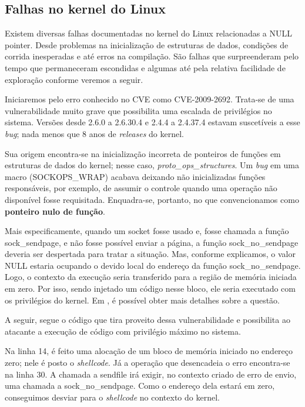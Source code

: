 		
		\subsection{Falhas no kernel do Linux}
		\label{subsec:linux_kernel_vuln}
			Existem diversas falhas documentadas no kernel do Linux relacionadas a NULL pointer.
			Desde problemas na inicialização de estruturas de dados, condições de corrida
			inesperadas e até erros na compilação.		
			São falhas que surpreenderam pelo tempo que permaneceram escondidas e algumas até pela
			relativa facilidade de exploração conforme veremos a seguir.
	
			Iniciaremos pelo erro conhecido no CVE como CVE-2009-2692.
			Trata-se de uma vulnerabilidade muito grave que possibilita uma escalada de privilégios
			no sistema. Versões desde 2.6.0 a 2.6.30.4 e 2.4.4 a 2.4.37.4 estavam suscetíveis
			a esse \textsl{bug}; nada menos que 8 anos de \textsl{releases} do kernel.

			
			Sua origem encontra-se na inicialização incorreta de ponteiros de funções em estruturas
			de dados do kernel; nesse caso, \textsl{proto\_ops\_structures}. 
			Um \textsl{bug} em uma macro (SOCKOPS\_WRAP) acabava deixando não inicializadas
			funções responsáveis, por exemplo, de assumir o controle quando uma operação não disponível fosse
			requisitada. Enquadra-se, portanto, no que convencionamos como \textbf{ponteiro nulo de função}.

			
			Mais especificamente, quando um socket fosse usado e, fosse chamada a função sock\_sendpage,
			e não fosse possível enviar a página, a função sock\_no\_sendpage deveria ser despertada
			para tratar a situação. Mas, conforme explicamos, o valor NULL estaria ocupando o devido
			local do endereço da função sock\_no\_sendpage. Logo, o contexto da execução seria transferido
			para a região de memória iniciada em zero. Por isso, sendo injetado um código nesse bloco,
			ele seria executado com os privilégios do kernel. Em \cite{Tinnes2009}, é possível
			obter mais detalhes	sobre a questão.

	
			A seguir, segue o código que tira proveito dessa vulnerabilidade e possibilita ao atacante
			a execução de código com privilégio máximo no sistema.  
			
			Na linha 14, é feito uma alocação de um bloco de memória iniciado no endereço zero; nele é posto
			o \textsl{shellcode}. Já a operação que desencadeia o erro encontra-se na linha 30.
			A chamada a sendfile irá exigir, no contexto criado de erro de envio, uma chamada 
			a sock\_no\_sendpage.
			Como o endereço dela estará em zero, conseguimos desviar para o \textsl{shellcode} no contexto do kernel.

